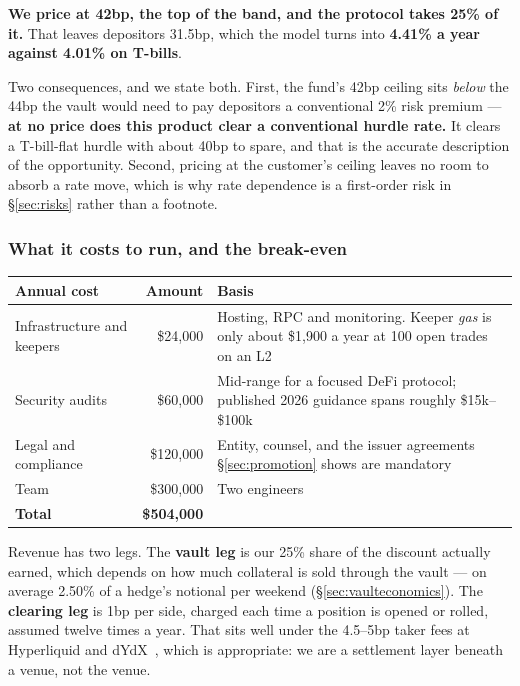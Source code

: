\documentclass[11pt,a4paper]{article}
\begin{document}
\textbf{We price at 42bp, the top of the band, and the protocol takes 25\% of it.} That leaves
depositors 31.5bp, which the model turns into \textbf{4.41\% a year against 4.01\% on T-bills}.

Two consequences, and we state both. First, the fund's 42bp ceiling sits \emph{below} the 44bp the
vault would need to pay depositors a conventional 2\% risk premium — \textbf{at no price does this
product clear a conventional hurdle rate.} It clears a T-bill-flat hurdle with about 40bp to spare,
and that is the accurate description of the opportunity. Second, pricing at the customer's ceiling
leaves no room to absorb a rate move, which is why rate dependence is a first-order risk in
\S\ref{sec:risks} rather than a footnote.

\subsubsection*{What it costs to run, and the break-even}

\begin{center}
\small
\begin{tabular}{@{}lrp{7.6cm}@{}}
\toprule
\textbf{Annual cost} & \textbf{Amount} & \textbf{Basis} \\
\midrule
Infrastructure and keepers & \$24{,}000 & Hosting, RPC and monitoring. Keeper \emph{gas} is only about \$1{,}900 a year at 100 open trades on an L2 \\
Security audits & \$60{,}000 & Mid-range for a focused DeFi protocol; published 2026 guidance spans roughly \$15k--\$100k~\cite{sherlock} \\
Legal and compliance & \$120{,}000 & Entity, counsel, and the issuer agreements \S\ref{sec:promotion} shows are mandatory \\
Team & \$300{,}000 & Two engineers \\
\midrule
\textbf{Total} & \textbf{\$504{,}000} & \\
\bottomrule
\end{tabular}
\end{center}

Revenue has two legs. The \textbf{vault leg} is our 25\% share of the discount actually earned, which
depends on how much collateral is sold through the vault — on average 2.50\% of a hedge's notional
per weekend (\S\ref{sec:vaulteconomics}). The \textbf{clearing leg} is 1bp per side, charged each
time a position is opened or rolled, assumed twelve times a year. That sits well under the 4.5--5bp
taker fees at Hyperliquid and dYdX~\cite{hlfees}, which is appropriate: we are a settlement layer
beneath a venue, not the venue.
\end{document}
